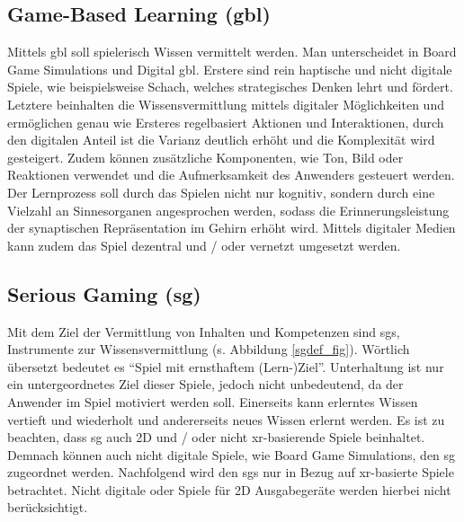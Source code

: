 \documentclass[conference]{IEEEtran}
\begin{document}
\subsection{Game-Based Learning (\gls{gbl})}
Mittels \gls{gbl} soll spielerisch Wissen vermittelt werden. Man unterscheidet in Board Game Simulations und Digital \gls{gbl}.
Erstere sind rein haptische und nicht digitale Spiele, wie beispielsweise Schach, welches strategisches Denken lehrt und fördert.
Letztere beinhalten die Wissensvermittlung mittels digitaler Möglichkeiten und ermöglichen genau wie Ersteres regelbasiert Aktionen und Interaktionen,
durch den digitalen Anteil ist die Varianz deutlich erhöht und die Komplexität wird gesteigert.
Zudem können zusätzliche Komponenten, wie Ton, Bild oder Reaktionen verwendet und die Aufmerksamkeit des Anwenders gesteuert werden.
Der Lernprozess soll durch das Spielen nicht nur kognitiv, sondern durch eine Vielzahl an Sinnesorganen angesprochen werden, sodass die Erinnerungsleistung der
synaptischen Repräsentation im Gehirn erhöht wird\cite{fabulagames}.
Mittels digitaler Medien kann zudem das Spiel dezentral und / oder vernetzt umgesetzt werden\cite{a3}.




\subsection{Serious Gaming (\gls{sg})}
Mit dem Ziel der Vermittlung von Inhalten und Kompetenzen sind \gls{sg}s, Instrumente zur Wissensvermittlung (s. Abbildung \ref{sgdef_fig}).
Wörtlich übersetzt bedeutet es ``Spiel mit ernsthaftem (Lern-)Ziel''.
Unterhaltung ist nur ein untergeordnetes Ziel dieser Spiele, jedoch nicht unbedeutend, da der Anwender im Spiel motiviert werden soll.
Einerseits kann erlerntes Wissen vertieft und wiederholt und andererseits neues Wissen erlernt werden.
Es ist zu beachten, dass \gls{sg} auch 2D und / oder nicht \gls{xr}-basierende Spiele beinhaltet.
Demnach können auch nicht digitale Spiele, wie Board Game Simulations, den \gls{sg} zugeordnet werden.
Nachfolgend wird den \gls{sg}s nur in Bezug auf \gls{xr}-basierte Spiele betrachtet.
Nicht digitale oder Spiele für 2D Ausgabegeräte werden hierbei nicht berücksichtigt.
\end{document}
